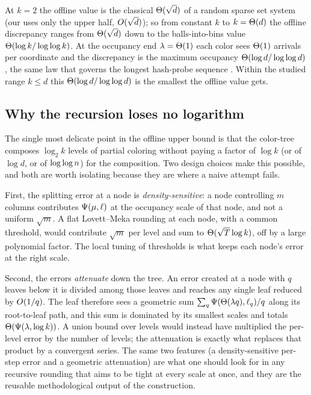 At $k=2$ the offline value is the classical $\Theta(\sqrt d)$ of a random sparse set system
\cite{BansalMeka2019,EzraLovett2016,HobergRothvoss2019} (our  uses only the upper half, $O(\sqrt d)$);
so from constant $k$ to $k=\Theta(d)$ the offline discrepancy ranges from $\Theta(\sqrt d)$ down to the balls-into-bins value
$\Theta(\log k/\log\log k)$. At the occupancy end $\lambda=\Theta(1)$ each color sees $\Theta(1)$ arrivals per coordinate and the
discrepancy is the maximum occupancy $\Theta(\log d/\log\log d)$, the same law that governs the longest hash-probe sequence
\cite{Gonnet1981}. Within the studied range $k\le d$ this $\Theta(\log d/\log\log d)$ is the smallest the offline value
gets.

\subsection{Why the recursion loses no logarithm}\label{sec:disc-technique}

The single most delicate point in the offline upper bound is that the color-tree composes $\log_2 k$ levels of partial
coloring without paying a factor of $\log k$ (or of $\log d$, or of $\log\log n$) for the composition. Two design choices make
this possible, and both are worth isolating because they are where a naive attempt fails.

First, the splitting error at a node is \emph{density-sensitive}: a node controlling $m$ columns contributes
$\Psi(\mu,\ell)$ at the occupancy scale of that node, and not a uniform $\sqrt m$. A flat Lovett--Meka rounding at each
node, with a common threshold, would contribute $\sqrt m$ per level and sum to $\Theta(\sqrt T\log k)$, off by a large
polynomial factor. The local tuning of thresholds is what keeps each node's error at the right scale.

Second, the errors \emph{attenuate} down the tree. An error created at a node with $q$ leaves below it is divided among those
leaves and reaches any single leaf reduced by $O(1/q)$. The leaf therefore sees a geometric sum $\sum_q \Psi(\Theta(\lambda
q),\ell_q)/q$ along its root-to-leaf path, and this sum is dominated by its smallest scales and totals $\Theta(\Psi(\lambda,\log
k))$. A union bound over levels would instead have multiplied the per-level error by the number of levels; the attenuation is
exactly what replaces that product by a convergent series. The same two features (a density-sensitive per-step error and a
geometric attenuation) are what one should look for in any recursive rounding that aims to be tight at every scale at once,
and they are the reusable methodological output of the construction.

